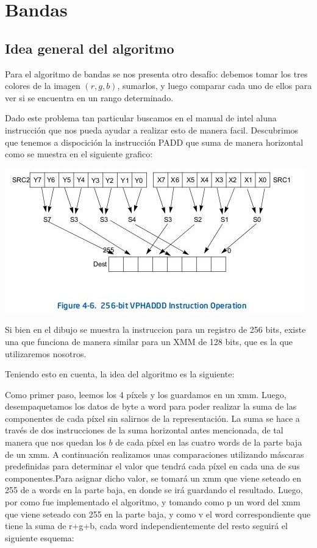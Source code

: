 \documentclass[a4paper]{article}
\begin{document}
\newpage
\section{Bandas}
\subsection{Idea general del algoritmo}
Para el algoritmo de bandas se nos presenta otro desafío: debemos tomar los tres colores de la imagen $(r,g,b)$, sumarlos, y luego comparar cada uno de ellos para ver si se encuentra en un rango determinado.

Dado este problema tan particular buscamos en el manual de intel aluna instrucción que nos pueda ayudar a realizar esto de manera facil. Descubrimos que tenemos a dispocición la instrucción PADD que suma de manera horizontal como se muestra en el siguiente grafico:

\begin{center}
\includegraphics[scale=0.66]{Dibujos/SH.jpg}
\end{center}

Si bien en el dibujo se muestra la instruccion para un registro de 256 bits, existe una que funciona de manera similar para un XMM de 128 bits, que es la que utilizaremos nosotros.

Teniendo esto en cuenta, la idea del algoritmo es la siguiente:

Como primer paso, leemos los 4 píxels y los guardamos en un xmm. Luego, desempaquetamos los datos de byte a word para poder realizar la suma de las componentes de cada píxel sin salirnos de la representación. La suma se hace a través de dos instrucciones de la suma horizontal antes mencionada, de tal manera que nos quedan los $b$ de cada píxel en las cuatro words de la parte baja de un xmm. A continuación realizamos unas comparaciones utilizando máscaras predefinidas para determinar el valor que tendrá cada píxel en cada una de sus componentes.Para asignar dicho valor, se tomará un xmm que viene seteado en 255 de a words en la parte baja, en donde se irá guardando el resultado. Luego, por como fue implementado el algoritmo, y tomando como p un word del xmm que viene seteado con 255 en la parte baja, y como v el word correspondiente que tiene la suma de r+g+b, cada word independientemente del resto seguirá el siguiente esquema:
\end{document}

